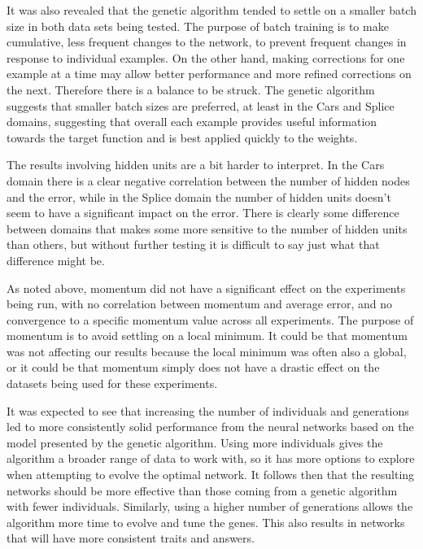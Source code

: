 \documentclass[10pt, conference, compsocconf]{IEEEtran}
\begin{document}
It was also revealed that the genetic algorithm tended to settle on a smaller batch size in both data sets being tested. The purpose of batch training is to make cumulative, less frequent changes to the network, to prevent frequent changes in response to individual examples. On the other hand, making corrections for one example at a time may allow better performance and more refined corrections on the next. Therefore there is a balance to be struck. The genetic algorithm suggests that smaller batch sizes are preferred, at least in the Cars and Splice domains, suggesting that overall each example provides useful information towards the target function and is best applied quickly to the weights.

The results involving hidden units are a bit harder to interpret. In the Cars domain there is a clear negative correlation between the number of hidden nodes and the error, while in the Splice domain the number of hidden units doesn't seem to have a significant impact on the error. There is clearly some difference between domains that makes some more sensitive to the number of hidden units than others, but without further testing it is difficult to say just what that difference might be.

As noted above, momentum did not have a significant effect on the experiments being run, with no correlation between momentum and average error, and no convergence to a specific momentum value across all experiments. The purpose of momentum is to avoid settling on a local minimum. It could be that momentum was not affecting our results because the local minimum was often also a global, or it could be that momentum simply does not have a drastic effect on the datasets being used for these experiments.

It was expected to see that increasing the number of individuals and generations led to more consistently solid performance from the neural networks based on the model presented by the genetic algorithm. Using more individuals gives the algorithm a broader range of data to work with, so it has more options to explore when attempting to evolve the optimal network. It follows then that the resulting networks should be more effective than those coming from a genetic algorithm with fewer individuals. Similarly, using a higher number of generations allows the algorithm more time to evolve and tune the genes. This also results in networks that will have more consistent traits and answers.
\end{document}
